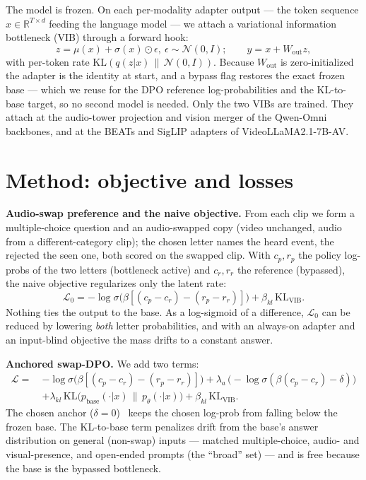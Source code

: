\documentclass{article}
\newcommand{\KL}{\mathrm{KL}}
\begin{document}
The model is frozen. On each per-modality adapter output --- the token sequence $x\in\mathbb{R}^{T\times d}$
feeding the language model --- we attach a variational information bottleneck (VIB) through a forward hook:
\begin{equation}
z=\mu(x)+\sigma(x)\odot\epsilon,\ \epsilon\sim\mathcal N(0,I);\qquad y=x+W_{\text{out}}z,
\end{equation}
with per-token rate $\KL(q(z|x)\,\|\,\mathcal N(0,I))$. Because $W_{\text{out}}$ is zero-initialized the
adapter is the identity at start, and a bypass flag restores the exact frozen base --- which we reuse for
the DPO reference log-probabilities and the KL-to-base target, so no second model is needed. Only the two
VIBs are trained. They attach at the audio-tower projection and vision merger of the Qwen-Omni backbones,
and at the BEATs and SigLIP adapters of VideoLLaMA2.1-7B-AV.

\section{Method: objective and losses}
\label{sec:method}
\textbf{Audio-swap preference and the naive objective.} From each clip we form a multiple-choice question
and an audio-swapped copy (video unchanged, audio from a different-category clip); the chosen letter names
the heard event, the rejected the seen one, both scored on the swapped clip. With $c_p,r_p$ the policy
log-probs of the two letters (bottleneck active) and $c_r,r_r$ the reference (bypassed), the naive
objective regularizes only the latent rate:
\begin{equation}
\mathcal L_0=-\log\sigma\!\big(\beta[(c_p-c_r)-(r_p-r_r)]\big)+\beta_{kl}\,\KL_{\text{VIB}}.
\label{eq:naive}
\end{equation}
Nothing ties the output to the base. As a log-sigmoid of a difference, $\mathcal L_0$ can be reduced by
lowering \emph{both} letter probabilities, and with an always-on adapter and an input-blind objective the
mass drifts to a constant answer.

\textbf{Anchored swap-DPO.} We add two terms:
\begin{align}
\mathcal L=\ &-\log\sigma\!\big(\beta[(c_p-c_r)-(r_p-r_r)]\big)
 +\lambda_{a}\,\big(\!-\log\sigma(\beta(c_p-c_r)-\delta)\big)\nonumber\\
 &+\lambda_{kl}\,\KL\!\big(p_{\text{base}}(\cdot|x)\,\|\,p_\theta(\cdot|x)\big)+\beta_{kl}\,\KL_{\text{VIB}}.
\label{eq:anchored}
\end{align}
The chosen anchor ($\delta{=}0$)~\cite{mdpo,dpop} keeps the chosen log-prob from falling below the frozen
base. The KL-to-base term penalizes drift from the base's answer distribution on general (non-swap) inputs
--- matched multiple-choice, audio- and visual-presence, and open-ended prompts (the ``broad'' set) --- and
is free because the base is the bypassed bottleneck.
\end{document}
